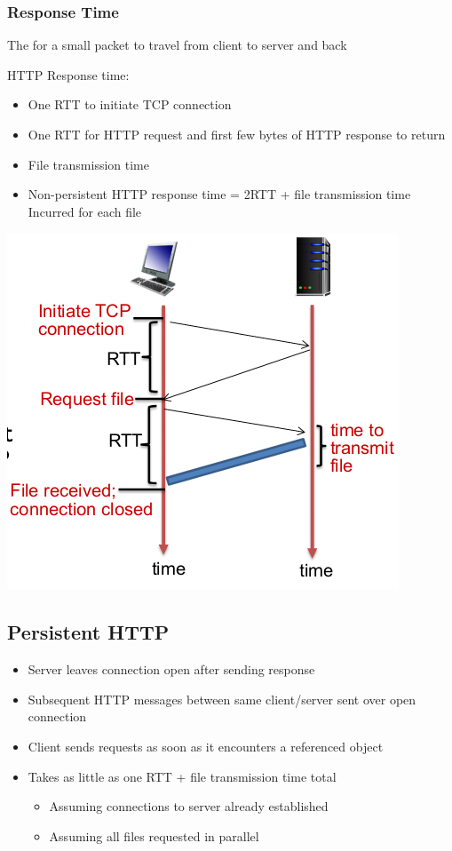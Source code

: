\documentclass{article}[18pt]
\begin{document}
\subsubsection{Response Time}
\begin{defin}
The for a small packet to travel from client to server and back
\end{defin}
HTTP Response time:
\begin{itemize}
	\item One RTT to initiate TCP connection
	\item One RTT for HTTP request and first few bytes of HTTP response to return
	\item File transmission time
	\item Non-persistent HTTP response time = 2RTT + file transmission time\\
	Incurred for each file
\end{itemize}
\begin{center}
	\includegraphics[scale=0.7]{RTT}
\end{center}
\subsection{Persistent HTTP}
\begin{itemize}
	\item Server leaves connection open after sending response
	\item Subsequent HTTP messages between same client/server sent over open connection
	\item Client sends requests as soon as it encounters a referenced object
	\item Takes as little as one RTT + file transmission time total
	\begin{itemize}
		\item Assuming connections to server already established
		\item Assuming all files requested in parallel
	\end{itemize}
\end{itemize}
\end{document}
